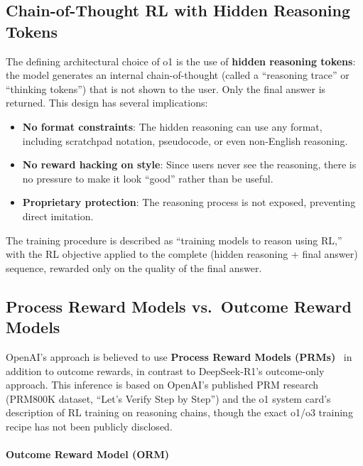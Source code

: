 \subsection{Chain-of-Thought RL with Hidden Reasoning Tokens}
\label{chain-of-thought-rl-with-hidden-reasoning-tokens}

The defining architectural choice of o1 is the use of \textbf{hidden reasoning tokens}: the model generates an internal chain-of-thought (called a ``reasoning trace'' or ``thinking tokens'') that is not shown to the user. Only the final answer is returned. This design has several implications:

\begin{itemize}
  \item \textbf{No format constraints}: The hidden reasoning can use any format, including scratchpad notation, pseudocode, or even non-English reasoning.
  \item \textbf{No reward hacking on style}: Since users never see the reasoning, there is no pressure to make it look ``good'' rather than be useful.
  \item \textbf{Proprietary protection}: The reasoning process is not exposed, preventing direct imitation.
\end{itemize}

The training procedure is described as ``training models to reason using RL,'' with the RL objective applied to the complete (hidden reasoning + final answer) sequence, rewarded only on the quality of the final answer.

\subsection{Process Reward Models vs.~Outcome Reward Models}
\label{process-reward-models-vs.-outcome-reward-models}

OpenAI’s approach is believed to use \textbf{Process Reward Models (PRMs)}~\cite{lightman2023lets} in addition to outcome rewards, in contrast to DeepSeek-R1’s outcome-only approach. This inference is based on OpenAI’s published PRM research (PRM800K dataset, ``Let’s Verify Step by Step'') and the o1 system card’s description of RL training on reasoning chains, though the exact o1/o3 training recipe has not been publicly disclosed.

\paragraph{Outcome Reward Model (ORM)}
\label{outcome-reward-model-orm}

